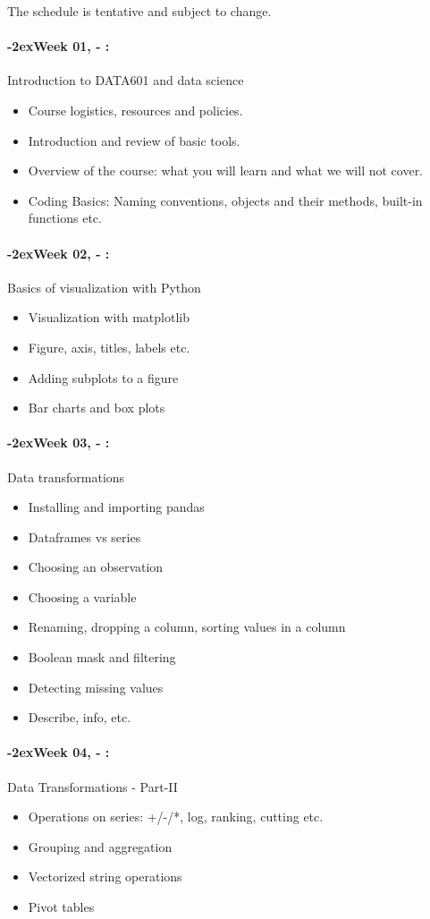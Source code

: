 \documentclass[11pt]{article}
\newcommand{\week}[1]{%
  \paragraph*{\kern-2ex\quad #1, \syldate{\today} - \AdvanceDate[4]\syldate{\today}:}%
  \ifdim\wd1=\wd\MONDAY
    \AdvanceDate[7]
  \else
    \AdvanceDate[7]
  \fi%
}
\begin{document}
The schedule is tentative and subject to change. 
\SetDate[23/08/2021]
\week{Week 01}  Introduction to DATA601 and data science
\begin{itemize}
\item Course logistics, resources and policies.
\item Introduction and review of basic tools.
\item Overview of the course: what you will learn and what we will not cover. 
\item Coding Basics: Naming conventions, objects and their methods, built-in functions etc.
\end{itemize}

\week{Week 02} Basics of visualization with Python
\begin{itemize}
\item Visualization with matplotlib
\item Figure, axis, titles, labels etc.
\item Adding subplots to a figure
\item Bar charts and box plots
\end{itemize}

\week{Week 03} Data transformations
\begin{itemize}
\item Installing and importing pandas
\item Dataframes vs series
\item Choosing an observation
\item Choosing a variable
\item Renaming, dropping a column, sorting values in a column
\item Boolean mask and filtering
\item Detecting missing values
\item Describe, info, etc. 
\end{itemize}

\week{Week 04} Data Transformations - Part-II
\begin{itemize}
\item Operations on series: +/-/*, log, ranking, cutting etc.
\item Grouping and aggregation
\item Vectorized string operations
\item Pivot tables
\end{itemize}
\end{document}

